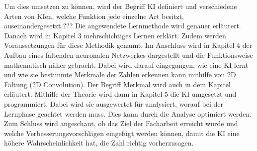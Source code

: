 \documentclass[11pt]{article}
\begin{document}
Um dies umsetzen zu können, wird der Begriff KI definiert und verschiedene Arten von KIen,
welche Funktion jede einzelne Art besitzt, auseinandergesetzt.??? Die angewendete Lernmethode wird genauer erläutert.
Danach wird in Kapitel 3 mehrschichtiges Lernen erklärt. Zudem werden Voraussetzungen für diese Methodik genannt. Im Anschluss wird in Kapitel 4
der Aufbau eines faltenden neuronalen Netzwerkes dargestellt und die Funktionsweise mathematisch näher gebracht. Dabei wird darauf eingegangen, wie eine KI
lernt und wie sie bestimmte Merkmale der Zahlen erkennen kann mithilfe von 2D Faltung (2D Convolution). Der Begriff Merkmal wird auch in dem Kapitel erläutert.
Mithilfe der Theorie wird dann in Kapitel 5 die KI umgesetzt und programmiert. Dabei wird sie ausgewertet für analysiert, worauf bei der Lernphase
geachtet werden muss. Dies kann durch die Analyse optimiert werden. Zum Schluss wird angeschaut, ob das Ziel der Facharbeit erreicht wurde und welche
Verbesserungsvorschlägen eingefügt werden können, damit die KI eine höhere Wahrscheinlichkeit hat, die Zahl richtig vorherzusagen.
\end{document}
